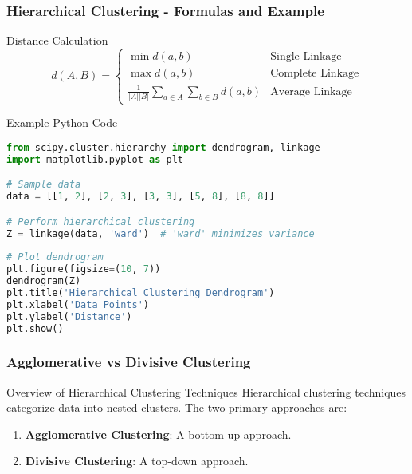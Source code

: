 \documentclass[aspectratio=169]{beamer}
\begin{document}
\begin{frame}[fragile]
    \frametitle{Hierarchical Clustering - Formulas and Example}
    \begin{block}{Distance Calculation}
        \begin{equation}
            d(A, B) = 
            \begin{cases}
                \min{d(a, b)} & \text{Single Linkage} \\
                \max{d(a, b)} & \text{Complete Linkage} \\
                \frac{1}{|A||B|} \sum_{a \in A} \sum_{b \in B} d(a,b) & \text{Average Linkage}
            \end{cases}
        \end{equation}
    \end{block}

    \begin{block}{Example Python Code}
        \begin{lstlisting}[language=python]
from scipy.cluster.hierarchy import dendrogram, linkage
import matplotlib.pyplot as plt

# Sample data
data = [[1, 2], [2, 3], [3, 3], [5, 8], [8, 8]]

# Perform hierarchical clustering
Z = linkage(data, 'ward')  # 'ward' minimizes variance
    
# Plot dendrogram
plt.figure(figsize=(10, 7))
dendrogram(Z)
plt.title('Hierarchical Clustering Dendrogram')
plt.xlabel('Data Points')
plt.ylabel('Distance')
plt.show()
        \end{lstlisting}
    \end{block}
\end{frame}

\begin{frame}[fragile]
    \frametitle{Agglomerative vs Divisive Clustering}
    \begin{block}{Overview of Hierarchical Clustering Techniques}
        Hierarchical clustering techniques categorize data into nested clusters. The two primary approaches are:
        \begin{enumerate}
            \item \textbf{Agglomerative Clustering}: A bottom-up approach.
            \item \textbf{Divisive Clustering}: A top-down approach.
        \end{enumerate}
    \end{block}
\end{frame}
\end{document}
